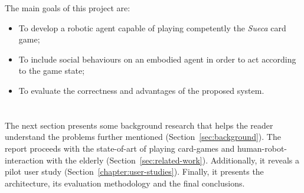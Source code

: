 The main goals of this project are:
\begin{itemize}
\item To develop a robotic agent capable of playing competently the \emph{Sueca} card game;
\item To include social behaviours on an embodied agent in order to act according to the game state;
\item To evaluate the correctness and advantages of the proposed system.
\end{itemize}

\section*{\centering*}

The next section presents some background research that helps the reader understand the problems further mentioned (Section~\ref{sec:background}).
The report proceeds with the state-of-art of playing card-games and human-robot-interaction with the elderly (Section~\ref{sec:related-work}).
Additionally, it reveals a pilot user study (Section~\ref{chapter:user-studies}).
Finally, it presents the architecture, its evaluation methodology and the final conclusions.
